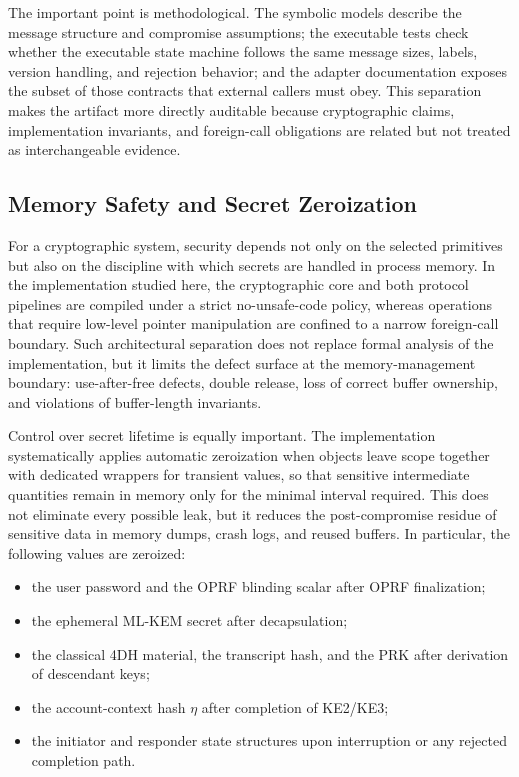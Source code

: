 \documentclass[preprint,12pt]{elsarticle}
\newcommand{\codeid}[1]{\textsf{#1}}
\theoremstyle{remark}
\begin{document}
The important point is methodological. The symbolic models describe the
message structure and compromise assumptions; the executable tests check
whether the executable state machine follows the same message sizes,
labels, version handling, and rejection behavior; and the adapter
documentation exposes the subset of those contracts that external
callers must obey. This separation makes the artifact more directly
auditable because cryptographic claims, implementation invariants, and
foreign-call obligations are
related but not treated as interchangeable evidence.

\subsection{Memory Safety and Secret Zeroization}

For a cryptographic system, security depends not only on the selected
primitives but also on the discipline with which secrets are handled in
process memory. In the implementation studied here, the
cryptographic core and both protocol pipelines are compiled under a
strict no-\codeid{unsafe}-code policy, whereas operations that require
low-level pointer manipulation are confined to a narrow foreign-call boundary.
Such architectural separation does not replace formal analysis of the
implementation, but it limits the defect surface at the
memory-management boundary: use-after-free defects, double release,
loss of correct buffer ownership, and violations of buffer-length
invariants.

Control over secret lifetime is equally important. The
implementation systematically applies automatic zeroization when
objects leave scope together with dedicated wrappers for transient
values, so that sensitive intermediate quantities remain in memory only
for the minimal interval required. This does not eliminate every
possible leak, but it reduces the post-compromise residue of
sensitive data in memory dumps, crash logs, and reused buffers. In particular, the
following values are zeroized:
\begin{itemize}
  \item the user password and the OPRF blinding scalar after OPRF
        finalization;
  \item the ephemeral ML-KEM secret after decapsulation;
  \item the classical 4DH material, the transcript hash, and the PRK
        after derivation of descendant keys;
  \item the account-context hash $\eta$ after completion of
        KE2/KE3;
  \item the initiator and responder state structures upon interruption
        or any rejected completion path.
\end{itemize}
\end{document}
